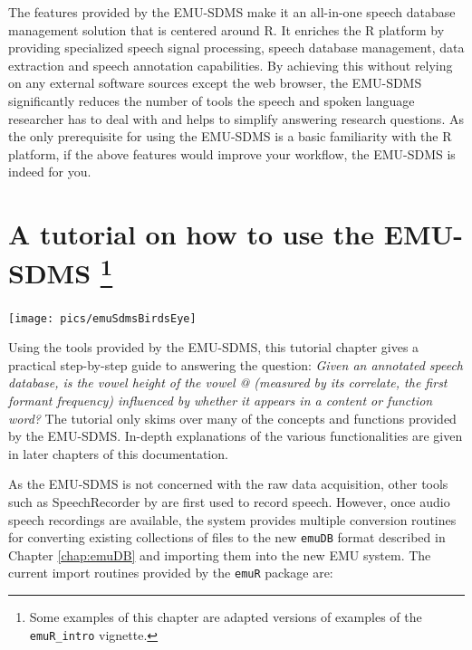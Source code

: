 \documentclass[]{book}
\let\rmarkdownfootnote\footnote%
\def\footnote{\protect\rmarkdownfootnote}
\begin{document}
The features provided by the EMU-SDMS make it an all-in-one speech database management solution that is centered around R. It enriches the R platform by providing specialized speech signal processing, speech database management, data extraction and speech annotation capabilities. By achieving this without relying on any external software sources except the web browser, the EMU-SDMS significantly reduces the number of tools the speech and spoken language researcher has to deal with and helps to simplify answering research questions. As the only prerequisite for using the EMU-SDMS is a basic familiarity with the R platform, if the above features would improve your workflow, the EMU-SDMS is indeed for you.

\hypertarget{chap:tutorial}{%
\chapter[A tutorial on how to use the EMU-SDMS ]{\texorpdfstring{A tutorial on how to use the EMU-SDMS \footnote{Some examples of this chapter are adapted versions of examples of the \texttt{emuR\_intro} vignette.}}{A tutorial on how to use the EMU-SDMS }}\label{chap:tutorial}}

\begin{center}\texttt{[image: pics/emuSdmsBirdsEye]} \end{center}

Using the tools provided by the EMU-SDMS, this tutorial chapter gives a practical step-by-step guide to answering the question: \emph{Given an annotated speech database, is the vowel height of the vowel @ (measured by its correlate, the first formant frequency) influenced by whether it appears in a content or function word?} The tutorial only skims over many of the concepts and functions provided by the EMU-SDMS. In-depth explanations of the various functionalities are given in later chapters of this documentation.

As the EMU-SDMS is not concerned with the raw data acquisition, other tools such as SpeechRecorder by \citet{draxler:2004a} are first used to record speech. However, once audio speech recordings are available, the system provides multiple conversion routines for converting existing collections of files to the new \texttt{emuDB} format described in Chapter \ref{chap:emuDB} and importing them into the new EMU system. The current import routines provided by the \texttt{emuR} package are:
\end{document}
